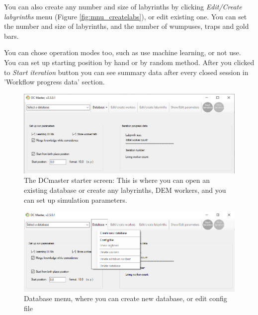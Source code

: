 \documentclass[a4paper,12pt]{article}
\begin{document}
You can also create any number and size of labyrinths by clicking \textit{Edit/Create labyrinths} menu (Figure \ref{fig:mnu_createlabs}), or edit existing one. You can set the number and size of  labyrinths, and the number of wumpuses, traps and gold bars. 



You can chose operation modes too, such as use machine learning, or not use. You can set up starting position by hand or by random method. After you clicked to \textit{Start iteration} button you can see summary data after every closed session in 'Workflow progress data' section.

\begin{figure}
	\begin{center}
	\includegraphics[width=15cm]{master1.png}
		\caption{The DCmaster starter screen: This is where you can open an existing database or create any labyrinths, DEM workers, and you can set up simulation parameters. }
\label{fig:master1}
	\end{center}
\end{figure}

\begin{figure}
	\begin{center}
		\includegraphics[width=13cm]{menu_database.png}
		\caption{Database menu, where you can create new database, or edit config file}
		\label{fig:menu_database}
	\end{center}
\end{figure}
\end{document}
